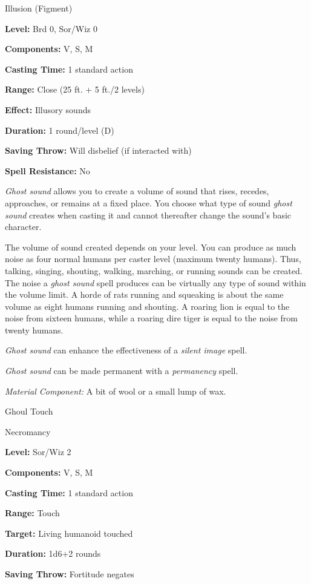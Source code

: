 \documentclass{article}
\begin{document}
Illusion (Figment)

\textbf{Level:} Brd 0, Sor/Wiz 0

\textbf{Components:} V, S, M

\textbf{Casting Time:} 1 standard action

\textbf{Range:} Close (25 ft. + 5 ft./2 levels)

\textbf{Effect:} Illusory sounds

\textbf{Duration:} 1 round/level (D)

\textbf{Saving Throw: }Will disbelief (if interacted with)

\textbf{Spell Resistance:} No

\textit{Ghost sound }allows you to create a volume of sound that rises, recedes, 
approaches, or remains at a fixed place. You choose what type of sound \textit{ghost 
sound }creates when casting it and cannot thereafter change the sound's basic character.

The volume of sound created depends on your level. You can produce as much noise 
as four normal humans per caster level (maximum twenty humans). Thus, talking, 
singing, shouting, walking, marching, or running sounds can be created. The noise 
a \textit{ghost sound }spell produces can be virtually any type of sound within 
the volume limit. A horde of rats running and squeaking is about the same volume 
as eight humans running and shouting. A roaring lion is equal to the noise from 
sixteen humans, while a roaring dire tiger is equal to the noise from twenty humans.

\textit{Ghost sound }can enhance the effectiveness of a \textit{silent image }spell.

\textit{Ghost sound }can be made permanent with a \textit{permanency }spell.

\textit{Material Component: }A bit of wool or a small lump of wax.

\vspace{12pt}
Ghoul Touch

Necromancy

\textbf{Level:} Sor/Wiz 2

\textbf{Components:} V, S, M

\textbf{Casting Time:} 1 standard action

\textbf{Range:} Touch

\textbf{Target:} Living humanoid touched

\textbf{Duration:} 1d6+2 rounds

\textbf{Saving Throw:} Fortitude negates
\end{document}
